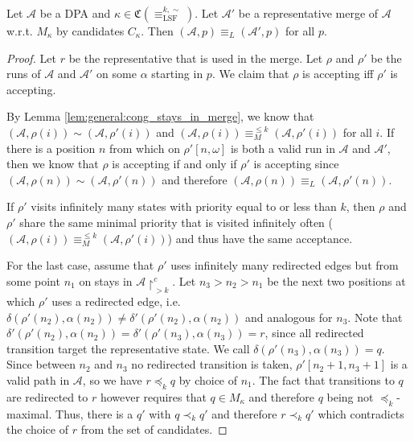\begin{lem}
	Let $\mathcal{A}$ be a DPA and $\kappa \in \mathfrak{C}(\equiv_\text{LSF}^{k,\sim})$. Let $\mathcal{A}'$ be a representative merge of $\mathcal{A}$ w.r.t. $M_\kappa$ by candidates $C_\kappa$. Then $(\mathcal{A}, p) \equiv_L (\mathcal{A}', p)$ for all $p$.
	\label{lem:lsf:preserve_language}
\end{lem}

\begin{proof}
	Let $r$ be the representative that is used in the merge. Let $\rho$ and $\rho'$ be the runs of $\mathcal{A}$ and $\mathcal{A}'$ on some $\alpha$ starting in $p$. We claim that $\rho$ is accepting iff $\rho'$ is accepting.
	
	By Lemma \ref{lem:general:cong_stays_in_merge}, we know that $(\mathcal{A}, \rho(i)) \sim (\mathcal{A}, \rho'(i))$ and $(\mathcal{A}, \rho(i)) \equiv_M^{\leq k} (\mathcal{A}, \rho'(i))$ for all $i$. If there is a position $n$ from which on $\rho'[n,\omega]$ is both a valid run in $\mathcal{A}$ and $\mathcal{A}'$, then we know that $\rho$ is accepting if and only if $\rho'$ is accepting since $(\mathcal{A}, \rho(n)) \sim (\mathcal{A}, \rho'(n))$ and therefore $(\mathcal{A}, \rho(n)) \equiv_L (\mathcal{A}, \rho'(n))$.
	
	If $\rho'$ visits infinitely many states with priority equal to or less than $k$, then $\rho$ and $\rho'$ share the same minimal priority that is visited infinitely often ($(\mathcal{A}, \rho(i)) \equiv_M^{\leq k} (\mathcal{A}, \rho'(i))$) and thus have the same acceptance.
	
	For the last case, assume that $\rho'$ uses infinitely many redirected edges but from some point $n_1$ on stays in $\mathcal{A}\upharpoonright^c_{>k}$. Let $n_3 > n_2 > n_1$ be the next two positions at which $\rho'$ uses a redirected edge, i.e. $\delta(\rho'(n_2), \alpha(n_2)) \neq \delta'(\rho'(n_2), \alpha(n_2))$ and analogous for $n_3$. Note that $\delta'(\rho'(n_2), \alpha(n_2)) = \delta'(\rho'(n_3), \alpha(n_3)) = r$, since all redirected transition target the representative state. We call $\delta(\rho'(n_3), \alpha(n_3)) = q$. Since between $n_2$ and $n_3$ no redirected transition is taken, $\rho'[n_2 + 1, n_3 + 1]$ is a valid path in $\mathcal{A}$, so we have $r \preceq_k q$ by choice of $n_1$. The fact that transitions to $q$ are redirected to $r$ however requires that $q \in M_\kappa$ and therefore $q$ being not $\preceq_k$-maximal. Thus, there is a $q'$ with $q \prec_k q'$ and therefore $r \prec_k q'$ which contradicts the choice of $r$ from the set of candidates.
\end{proof}

